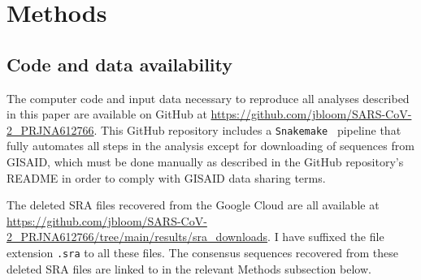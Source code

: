 \documentclass[9pt,twocolumn,twoside]{gsajnl_modified}
\begin{document}
{\small

\section{Methods}
\subsection{Code and data availability}
The computer code and input data necessary to reproduce all analyses described in this paper are available on GitHub at \url{https://github.com/jbloom/SARS-CoV-2_PRJNA612766}.
This GitHub repository includes a \texttt{Snakemake}~\citep{molder2021sustainable} pipeline that fully automates all steps in the analysis except for downloading of sequences from GISAID, which must be done manually as described in the GitHub repository's README in order to comply with GISAID data sharing terms.

The deleted SRA files recovered from the Google Cloud are all available at  \url{https://github.com/jbloom/SARS-CoV-2_PRJNA612766/tree/main/results/sra_downloads}.
I have suffixed the file extension \texttt{.sra} to all these files.
The consensus sequences recovered from these deleted SRA files are linked to in the relevant Methods subsection below.

}
\end{document}
